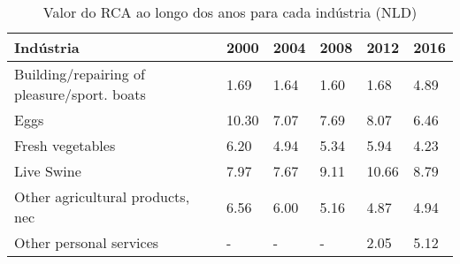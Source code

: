 \begin{table}
\centering
\caption{Valor do RCA ao longo dos anos para cada indústria (NLD)}
\label{tab:ex3-tempo-NLD}
\begin{tabular}{p{6cm}p{1.5cm}p{1.5cm}p{1.5cm}p{1.5cm}p{1.5cm}}
\toprule
                                  Indústria &  2000 & 2004 & 2008 &  2012 & 2016 \\
\midrule
Building/repairing of pleasure/sport. boats &  1.69 & 1.64 & 1.60 &  1.68 & 4.89 \\
                                       Eggs & 10.30 & 7.07 & 7.69 &  8.07 & 6.46 \\
                           Fresh vegetables &  6.20 & 4.94 & 5.34 &  5.94 & 4.23 \\
                                 Live Swine &  7.97 & 7.67 & 9.11 & 10.66 & 8.79 \\
           Other agricultural products, nec &  6.56 & 6.00 & 5.16 &  4.87 & 4.94 \\
                    Other personal services &     - &    - &    - &  2.05 & 5.12 \\
\bottomrule
\end{tabular}
\end{table}
